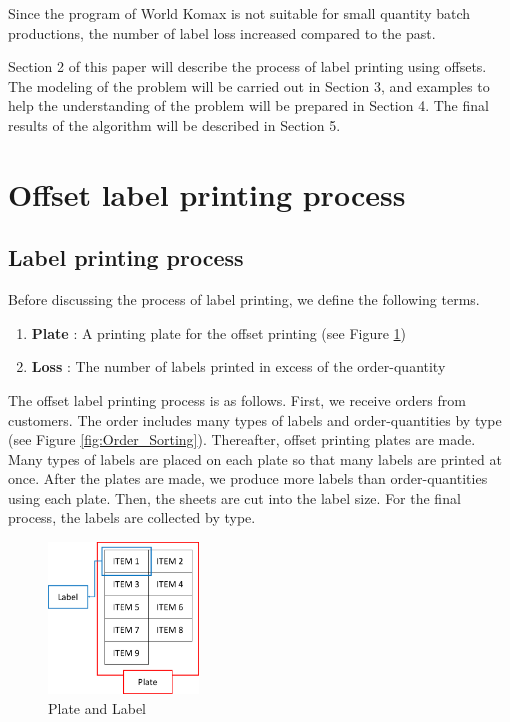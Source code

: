 \documentclass[a4paper]{amsart}
\numberwithin{equation}{section} %
\numberwithin{figure}{section} %
\numberwithin{table}{section}
\theoremstyle{plain}
\theoremstyle{definition}
\theoremstyle{plain}
\theoremstyle{plain}
\theoremstyle{plain}
\theoremstyle{plain}
\theoremstyle{plain}
\begin{document}
\noindent
Since the program of World Komax is not suitable for small quantity batch productions, the number of label loss increased compared to the past.

Section 2 of this paper will describe the process of label printing using offsets. The modeling of the problem will be carried out in Section 3, and examples to help the understanding of the problem will be prepared in Section 4. The final results of the algorithm will be described in Section 5. 


\section{Offset label printing process}\label{sec:Offset}

\subsection{Label printing process}\label{subsec:LabelPrinting}
Before discussing the process of label printing, we define the following terms.
\begin{enumerate}[*]
	\item {\bf Plate} : A printing plate for the offset printing (see Figure \ref{fig:PlateLabel})
	\item {\bf Loss} : The number of labels printed in excess of the order-quantity
\end{enumerate}

The offset label printing process is as follows. First, we receive orders from customers. 
The order includes many types of labels and order-quantities by type (see Figure \ref{fig:Order_Sorting}). 
Thereafter, offset printing plates are made. 
Many types of labels are placed on each plate so that many labels are printed at once. 
After the plates are made, we produce more labels than order-quantities using each plate. 
Then, the sheets are cut into the label size. 
For the final process, the labels are collected by type.

\begin{figure}
	\includegraphics[width=4cm]{PlateLabel.pdf}
	\caption{Plate and Label}
	\label{fig:PlateLabel}       %
\end{figure}
\end{document}
